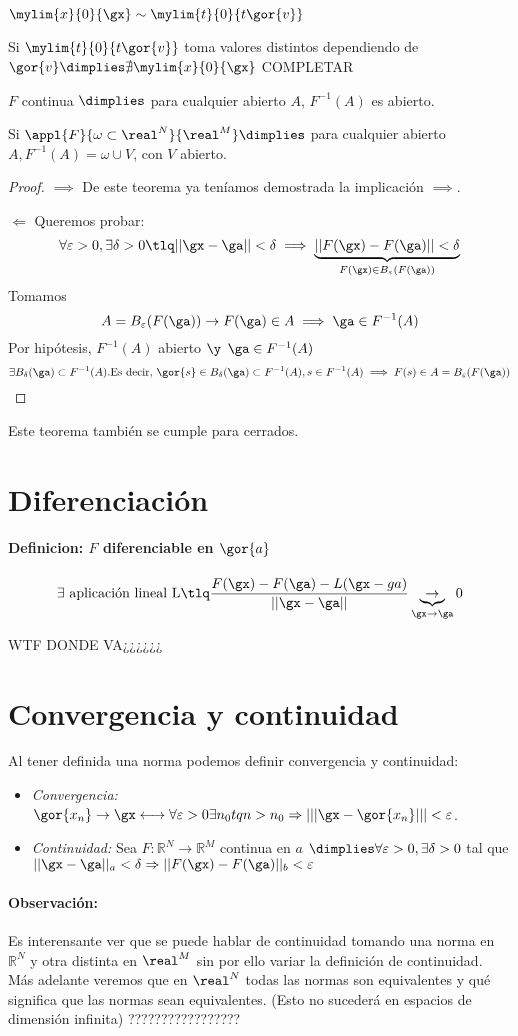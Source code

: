 \documentclass[a4paper,10pt]{apuntes}
\newcommand{\definition}[1]{\paragraph{Definicion: #1\\}}
\begin{document}
 $\displaystyle\mylim{x}{0}{\gx} \sim \mylim{t}{0}{t\gor{v}}$
 
 Si $\displaystyle\mylim{t}{0}{t\gor{v}}$ toma valores distintos dependiendo de $\gor{v} \dimplies \nexists \displaystyle\mylim{x}{0}{\gx}$
 COMPLETAR
\begin{theorem}
 $F$ continua $\dimplies$ para cualquier abierto $A$, $F^{-1}(A)$ es abierto.
\end{theorem}
\obs
Si $\appl{F}{\omega\subset\real^N}{\real^M} \dimplies$ para cualquier abierto $A, F^{-1}(A) = \omega \cup V$, con $V$ abierto.

\begin{proof}
$\implies$ De este teorema ya teníamos demostrada la implicación $\implies$.

$\Leftarrow$ Queremos probar: $$\forall \varepsilon > 0, \exists \delta>0 \tlq ||\gx-\ga||<\delta \implies \underbrace{||F(\gx)-F(\ga)||<\delta}_{F(\gx)\in B_{\varepsilon}(F(\ga))}$$
Tomamos  $$A = B_{\varepsilon}(F(\ga)) \rightarrow F(\ga) \in A \implies \ga \in F^{-1}(A)$$
Por hipótesis, $F^{-1}(A)$ abierto $\y$ $\ga \in F^{-1}(A)$
$$\exists B_{\delta}(\ga) \subset F^{-1}(A) \text{.Es decir, } \gor{s}\in B_{\delta}(\ga) \subset F^{-1}(A), s\in F^{-1}(A) \implies F(s) \in A = B_{\varepsilon}(F(\ga))$$

\end{proof}
\begin{remark}
Este teorema también se cumple para cerrados.
\end{remark}
\section{Diferenciación}
\definition{$F$ diferenciable en $\gor{a}$}
$$\exists \text{ aplicación lineal L} \tlq \frac{F(\gx)-F(\ga)-L(\gx-ga)}{||\gx-\ga||} \underbrace{\rightarrow}_{\gx\rightarrow\ga} 0$$

\newpage
WTF DONDE VA¿¿¿¿¿¿
\section{Convergencia y continuidad}
Al tener definida una norma podemos definir convergencia y continuidad:
\begin{itemize}
 \item\emph{Convergencia:} $\gor{x_n} \rightarrow \gx \longleftrightarrow \forall \varepsilon > 0 \exists n_0 tq n>n_0 \Rightarrow |||\gx-\gor{x_n}|||<\varepsilon$.
 \item\emph{Continuidad:} Sea $F: \mathbb{R}^N \rightarrow \mathbb{R}^M$ continua en $a$ $\dimplies \forall \varepsilon > 0 , \exists \delta > 0$ tal que $||\gx-\ga||_a < \delta \Rightarrow ||F(\gx)-F(\ga)||_b< \varepsilon$
\end{itemize}
\paragraph{Observación:} Es interensante ver que se puede hablar de continuidad tomando una norma en $\mathbb{R}^N$ y otra distinta en $\real^M$ sin por ello variar la definición de continuidad. Más adelante veremos que en $\real^N$ todas las normas son equivalentes y qué significa que las normas sean equivalentes. (Esto no sucederá en espacios de dimensión infinita)
?????????????????
\end{document}
